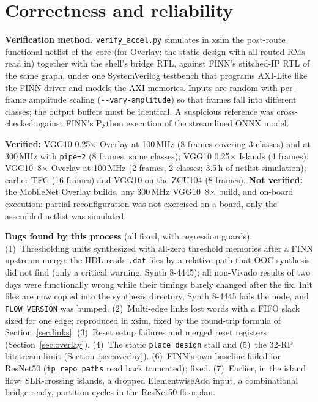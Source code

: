 \documentclass[10pt,twocolumn]{article}
\newcommand{\code}[1]{\texttt{\small #1}}
\begin{document}
\section{Correctness and reliability}
\textbf{Verification method.} \code{verify\_accel.py} simulates in xsim the post-route functional
netlist of the core (for Overlay: the static design with all routed RMs read in) together
with the shell's bridge RTL, against FINN's stitched-IP RTL of the same graph, under one
SystemVerilog testbench that programs AXI-Lite like the FINN driver and models the AXI memories.
Inputs are random with per-frame amplitude scaling (\code{-{}-vary-amplitude}) so that frames fall
into different classes; the output buffers must be identical. A suspicious reference was
cross-checked against FINN's Python execution of the streamlined ONNX model.

\textbf{Verified:} VGG10 0.25$\times$ Overlay at 100\,MHz (8 frames covering 3 classes) and at
300\,MHz with \code{pipe=2} (8 frames, same classes); VGG10 0.25$\times$ Islands (4 frames);
VGG10~8$\times$ Overlay at 100\,MHz (2 frames, 2 classes; 3.5\,h of netlist simulation); earlier
TFC (16 frames) and VGG10 on the ZCU104 (8 frames). \textbf{Not verified:} the MobileNet Overlay
builds, any 300\,MHz VGG10~8$\times$ build, and on-board execution: partial reconfiguration was
not exercised on a board, only the assembled netlist was simulated.

\textbf{Bugs found by this process} (all fixed, with regression guards):
(1)~Thresholding units synthesized with all-zero threshold memories after a FINN upstream merge:
the HDL reads \code{.dat} files by a relative path that OOC synthesis did not find (only a critical
warning, Synth 8-4445); all non-Vivado results of two days were functionally wrong while their
timings barely changed after the fix. Init files are now copied into the synthesis directory,
Synth 8-4445 fails the node, and \code{FLOW\_VERSION} was bumped. (2)~Multi-edge links lost words
with a FIFO slack sized for one edge; reproduced in xsim, fixed by the round-trip formula of
Section~\ref{sec:links}. (3)~Reset setup failures and merged reset registers (Section~\ref{sec:overlay}).
(4)~The static \code{place\_design} stall and (5)~the 32-RP bitstream limit
(Section~\ref{sec:overlay}). (6)~FINN's own baseline failed for ResNet50 (\code{ip\_repo\_paths}
read back truncated); fixed. (7)~Earlier, in the island flow: SLR-crossing islands, a dropped
ElementwiseAdd input, a combinational bridge ready, partition cycles in the ResNet50 floorplan.
\end{document}
